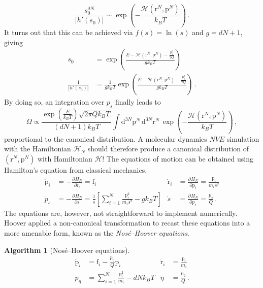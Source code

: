 \documentclass{article}
\theoremstyle{plain}\theoremheaderfont{\normalfont\itshape}\theorembodyfont{\rmfamily}\theoremseparator{.}\newtheorem*{rem}{Remark}\newtheorem*{ex}{Example}\newtheorem*{proof}{Proof}\newtheorem*{altp}{Alternative proof}
\theoremstyle{plain}\theoremheaderfont{\normalfont\bfseries}\theorembodyfont{\rmfamily}\theoremseparator{.}\newtheorem{thm}{Theorem}[section]\newtheorem{lem}[thm]{Lemma}\newtheorem{prop}[thm]{Proposition}\newtheorem*{cor}{Corollary}\newtheorem{defn}[thm]{Definition}\newtheorem{clm}[thm]{Claim}\newtheorem{clminproof}{Claim}\newtheorem{alg}[thm]{Algorithm}\newtheorem{hyp}[thm]{Hypothesis}\newtheorem{law}[thm]{Law}
\theoremstyle{break}\theoremheaderfont{\normalfont\itshape}\theorembodyfont{\rmfamily}\theoremseparator{.\medskip}\newtheorem*{proofskip}{Proof}\newtheorem*{exs}{Examples}\newtheorem*{rems}{Remarks}
\theoremstyle{break}\theoremheaderfont{\normalfont\bfseries}\theorembodyfont{\rmfamily}\theoremseparator{.\medskip}\newtheorem{lemskip}[thm]{Lemma}\newtheorem{defnskip}[thm]{Definition}\newtheorem{propskip}[thm]{Proposition}\newtheorem{thmskip}[thm]{Theorem}
\numberwithin{equation}{section}
\newcommand{\dd}[2][]{\mathrm{d}^{#1} #2\,}
\newcommand{\pdv}[3][]{\frac{\partial^{#1} #2}{{\partial #3}^{#1}}}
\newcommand{\vb}[1]{\bm{\mathrm{#1}}}
\newcommand{\abs}[1]{\left| #1 \right|}
\begin{document}
    \begin{equation}
        \frac{s_0^{dN}}{\abs{h'(s_0)}}\sim\exp\left(-\frac{\mathcal{H}(\vb{r}^N,\vb{p}^N)}{k_B T}\right)\,.
    \end{equation}
    It turns out that this can be achieved via \(f(s)=\ln(s)\) and \(g=dN+1\), giving
    \begin{align}
        s_0&=\exp\left(\frac{E-\mathcal{H}(\vb{r}^N,\vb{p}^N)-\frac{p_s^2}{2Q}}{gk_B T}\right)\\
        \frac{1}{\abs{h'(s_0)}}&=\frac{1}{gk_B T}\exp\left(\frac{E-\mathcal{H}(\vb{r}^N,\vb{p}^N)-\frac{p_s^2}{2Q}}{gk_B T}\right)\,.
    \end{align}
    By doing so, an integration over \(p_s\) finally leads to
    \begin{equation}
        \Omega\propto\frac{\exp\left(\frac{E}{k_B T}\right)\sqrt{2\pi Qk_B T}}{(dN+1)k_B T}\int\dd[3N]{\vb{p}^N}\dd[3N]{\vb{r}^N}\exp\left(-\frac{\mathcal{H}(\vb{r}^N,\vb{p}^N)}{k_B T}\right)\,,
    \end{equation}
    proportional to the canonical distribution. A molecular dynamics \(NVE\) simulation with the Hamiltonian \(\mathcal{H}_N\) should therefore produce a canonical distribution of \((\vb{r}^N,\vb{p}^N)\) with Hamiltonian \(\mathcal{H}\)! The equations of motion can be obtained using Hamilton's equation from classical mechanics.
    \begin{align}
        \dot{\vb{p}}_i&=-\pdv{H_N}{\vb{r}_i}=\vb{f}_i & \dot{\vb{r}}_i&=\pdv{H_N}{\vb{p}_i}=\frac{\vb{p}_i}{m_i s^2}\\
        \dot{p}_s&=-\pdv{H_N}{s}=\frac{1}{s}\left[\sum_{i=1}^{N}\frac{\vb{p}_i^2}{m_i s^2}-gk_B T\right] & \dot{s}&=\pdv{H_N}{p_s}=\frac{p_s}{Q}\,.
    \end{align}
    The equations are, however, not straightforward to implement numerically. Hoover applied a non-canonical transformation to recast these equations into a more amenable form, known as the \textit{Nos\'{e}--Hoover equations}.
    \begin{alg}[Nos\'{e}--Hoover equations]
        \begin{align}
            \dot{\vb{p}}_i&=\vb{f}_i-\frac{p_\eta}{Q}\vb{p}_i & \dot{\vb{r}}_i&=\frac{\vb{p}_i}{m_i} \\
            \dot{p}_\eta&=\sum_{i=1}^{N}\frac{\vb{p}_i^2}{m_i}-dNk_B T & \dot{\eta}&=\frac{p_\eta}{Q}\,.
        \end{align}
    \end{alg}
\end{document}
